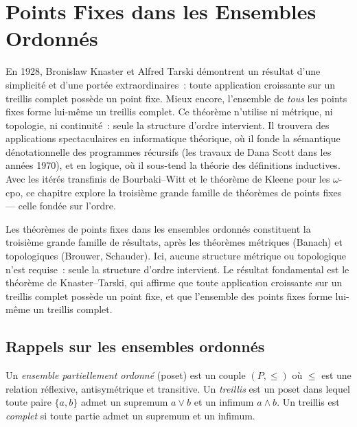 \chapter{Points Fixes dans les Ensembles Ordonn\'es}
\label{ch:ordonnes}

En 1928, Bronislaw Knaster et Alfred Tarski d\'emontrent un r\'esultat d'une simplicit\'e et d'une port\'ee extraordinaires~: toute application croissante sur un treillis complet poss\`ede un point fixe. Mieux encore, l'ensemble de \emph{tous} les points fixes forme lui-m\^eme un treillis complet. Ce th\'eor\`eme n'utilise ni m\'etrique, ni topologie, ni continuit\'e~: seule la structure d'ordre intervient. Il trouvera des applications spectaculaires en informatique th\'eorique, o\`u il fonde la s\'emantique d\'enotationnelle des programmes r\'ecursifs (les travaux de Dana Scott dans les ann\'ees 1970), et en logique, o\`u il sous-tend la th\'eorie des d\'efinitions inductives. Avec les it\'er\'es transfinis de Bourbaki--Witt et le th\'eor\`eme de Kleene pour les $\omega$-cpo, ce chapitre explore la troisi\`eme grande famille de th\'eor\`emes de points fixes --- celle fond\'ee sur l'ordre.

\begin{intuition}
Les th\'eor\`emes de points fixes dans les ensembles ordonn\'es constituent la troisi\`eme
grande famille de r\'esultats, apr\`es les th\'eor\`emes m\'etriques (Banach) et
topologiques (Brouwer, Schauder). Ici, aucune structure m\'etrique ou topologique n'est
requise~: seule la structure d'ordre intervient. Le r\'esultat fondamental est le
th\'eor\`eme de Knaster--Tarski, qui affirme que toute application croissante sur un
treillis complet poss\`ede un point fixe, et que l'ensemble des points fixes forme
lui-m\^eme un treillis complet.
\end{intuition}

\section{Rappels sur les ensembles ordonn\'es}

\begin{definition}
Un \emph{ensemble partiellement ordonn\'e} (poset) est un couple $(P, \leq)$ o\`u $\leq$
est une relation r\'eflexive, antisym\'etrique et transitive. Un \emph{treillis} est un
poset dans lequel toute paire $\{a, b\}$ admet un supremum $a \vee b$ et un infimum
$a \wedge b$. Un treillis est \emph{complet} si toute partie admet un supremum et un
infimum.
\end{definition}

